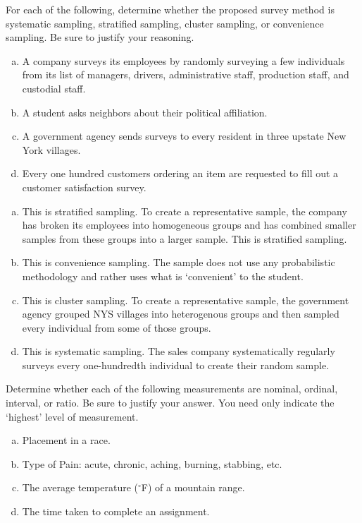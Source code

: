 \documentclass[11pt,letterpaper]{article}
\begin{document}

 For each of the following, determine whether the proposed survey method is systematic sampling, stratified sampling, cluster sampling, or convenience sampling. Be sure to justify your reasoning. 
	\begin{enumerate}[(a)]
	\item A company surveys its employees by randomly surveying a few individuals from its list of managers, drivers, administrative staff, production staff, and custodial staff. 
	\item A student asks neighbors about their political affiliation. 
	\item A government agency sends surveys to every resident in three upstate New York villages. 
	\item Every one hundred customers ordering an item are requested to fill out a customer satisfaction survey. 
	\end{enumerate} \pspace

\sol 
\begin{enumerate}[(a)]
\item This is stratified sampling. To create a representative sample, the company has broken its employees into homogeneous groups and has combined smaller samples from these groups into a larger sample. This is stratified sampling. \pspace

\item This is convenience sampling. The sample does not use any probabilistic methodology and rather uses what is `convenient' to the student. \pspace

\item This is cluster sampling. To create a representative sample, the government agency grouped NYS villages into heterogenous groups and then sampled every individual from some of those groups. \pspace

\item This is systematic sampling. The sales company systematically regularly surveys every one-hundredth individual to create their random sample. 
\end{enumerate}



\newpage



 Determine whether each of the following measurements are nominal, ordinal, interval, or ratio. Be sure to justify your answer. You need only indicate the `highest' level of measurement. 
	\begin{enumerate}[(a)]
	\item Placement in a race. 
	\item Type of Pain: acute, chronic, aching, burning, stabbing, etc.
	\item The average temperature ($^\circ$F) of a mountain range. 
	\item The time taken to complete an assignment. 
	\end{enumerate} \pspace
\end{document}
